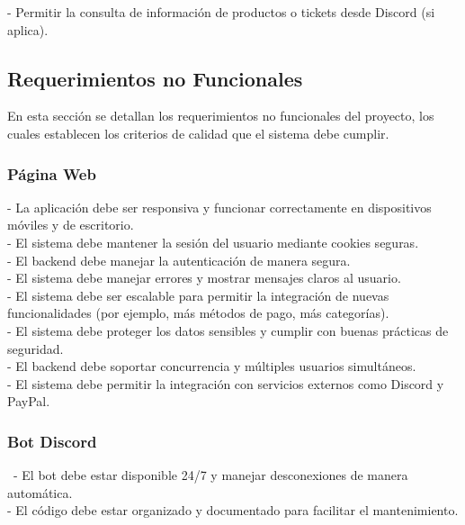 \documentclass[a4paper,12pt]{article}
\begin{document}
- Permitir la consulta de información de productos o tickets desde Discord (si aplica).\\
\newpage
\subsection{Requerimientos no Funcionales}
En esta sección se detallan los requerimientos no funcionales del proyecto, los cuales establecen los criterios de calidad que el sistema debe cumplir.
\subsubsection{Página Web}

- La aplicación debe ser responsiva y funcionar correctamente en dispositivos móviles y de escritorio.\\

- El sistema debe mantener la sesión del usuario mediante cookies seguras.\\

- El backend debe manejar la autenticación de manera segura.\\

- El sistema debe manejar errores y mostrar mensajes claros al usuario.\\

- El sistema debe ser escalable para permitir la integración de nuevas funcionalidades (por ejemplo, más métodos de pago, más categorías).\\

- El sistema debe proteger los datos sensibles y cumplir con buenas prácticas de seguridad.\\

- El backend debe soportar concurrencia y múltiples usuarios simultáneos.\\

- El sistema debe permitir la integración con servicios externos como Discord y PayPal.\\

\subsubsection{Bot Discord}\
- El bot debe estar disponible 24/7 y manejar desconexiones de manera automática.\\

- El código debe estar organizado y documentado para facilitar el mantenimiento.\\
\end{document}
